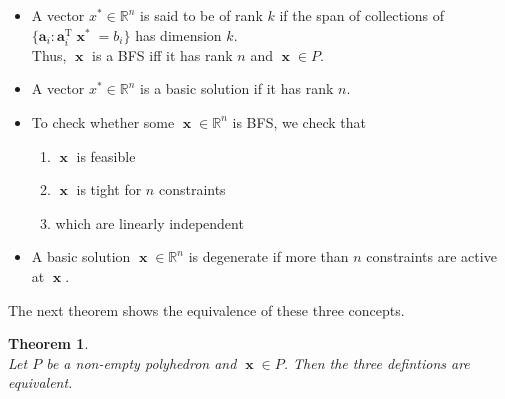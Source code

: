 \documentclass[12pt]{article}
\newcommand{\T}{\mathrm{T}}
\newcommand{\va}{\mathbf{a}}
\newtheorem{theorem}{Theorem}[section]
\theoremstyle{definition}
\DeclareMathOperator{\x}{\mathbf{x}}
\begin{document}
\begin{itemize}
  \item A vector $x^\ast\in\mathbb{R}^n$ is said to be of rank $k$ if the span of collections of $\{\va_i:\va_i^\T\x^\ast = b_i\}$ has dimension $k$.\\
  Thus, $\x$ is a BFS iff it has rank $n$ and $\x\in P$.
  \item A vector $x^\ast\in\mathbb{R}^n$ is a basic solution if it has rank $n$.
  \item To check whether some $\x\in\mathbb{R}^n$ is BFS, we check that 
  \begin{enumerate}
    \item $\x$ is feasible 
    \item $\x$ is tight for $n$ constraints 
    \item which are linearly independent
  \end{enumerate}
  \item A basic solution $\x\in\mathbb{R}^n$ is degenerate if more than $n$ constraints are active at $\x$.
\end{itemize}
The next theorem shows the equivalence of these three concepts.
\begin{theorem}
\hfill\\\normalfont Let $P$ be a non-empty polyhedron and $\x\in P$. Then the three defintions are equivalent.
\end{theorem}
\end{document}
